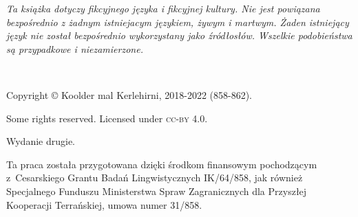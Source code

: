 \emph{Ta książka dotyczy fikcyjnego języka i fikcyjnej kultury. Nie jest
powiązana bezpośrednio z żadnym istniejacym językiem, żywym i martwym. Żaden
istniejący język nie został bezpośrednio wykorzystany jako źródłosłów. Wszelkie
podobieństwa są przypadkowe i niezamierzone.}

~\vfill

\begingroup
\setlength\parindent{0pt}\footnotesize
Copyright © Koolder mal Kerlehirni, 2018-2022 (858-862).

\bigskip

Some rights reserved. Licensed under \textsc{cc-by} 4.0.

Wydanie drugie.

\medskip

Ta praca została przygotowana dzięki środkom finansowym
pochodzącym z~Cesarskiego Grantu Badań Lingwistycznych IK/64/858,
jak również Specjalnego Funduszu Ministerstwa Spraw Zagranicznych dla
Przyszłej Kooperacji Terrańskiej, umowa numer 31/858.

\endgroup